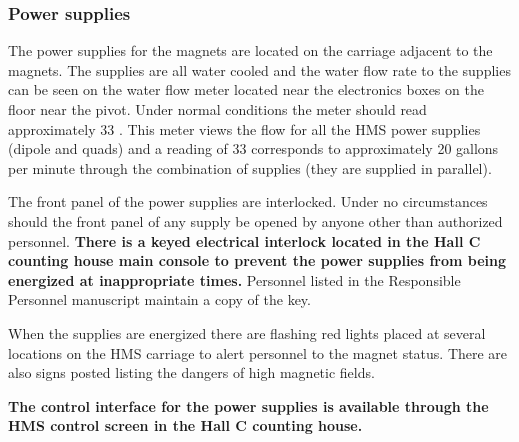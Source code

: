 \documentclass[12pt,epsf,here]{article}
\begin{document}
\subsubsection{Power supplies}

The power supplies for the magnets are located on the carriage adjacent to
the magnets. The supplies are all water cooled and the water flow rate to
the supplies can be seen on the water flow meter located near the
electronics boxes on the floor near the pivot. Under normal conditions the
meter should read approximately 33 . This meter views the flow for all the
HMS power supplies (dipole and quads) and a reading of 33 corresponds to
approximately 20 gallons per minute through the combination of supplies
(they are supplied in parallel).

The front panel of the power supplies are interlocked. Under no
circumstances should the front panel of any supply be opened by anyone
other than authorized personnel. \textbf{There is a keyed electrical
interlock located in the Hall C counting house main console to prevent the
power supplies from being energized at inappropriate times.} Personnel
listed in the Responsible Personnel manuscript maintain a copy of the key. 

When the supplies are energized there are flashing red lights placed at
several locations on the HMS carriage to alert personnel to the magnet
status. There are also signs posted listing the dangers of high magnetic
fields. 

\textbf{The control interface for the power supplies is available through
the HMS control screen in the Hall C counting house.} 
\end{document}

